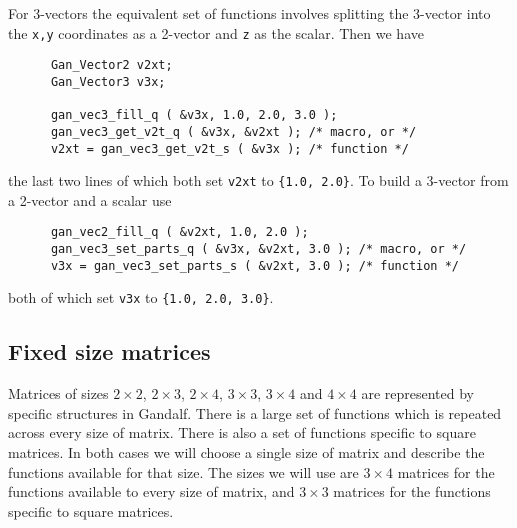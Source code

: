 For 3-vectors the equivalent set of functions involves splitting the
3-vector into the {\tt x,y} coordinates as a 2-vector and {\tt z} as the
scalar. Then we have
\begin{verbatim}
      Gan_Vector2 v2xt;
      Gan_Vector3 v3x;

      gan_vec3_fill_q ( &v3x, 1.0, 2.0, 3.0 );
      gan_vec3_get_v2t_q ( &v3x, &v2xt ); /* macro, or */
      v2xt = gan_vec3_get_v2t_s ( &v3x ); /* function */
\end{verbatim}
the last two lines of which both set {\tt v2xt} to {\tt \{1.0, 2.0\}}.
To build a 3-vector from a 2-vector and a scalar use
\begin{verbatim}
      gan_vec2_fill_q ( &v2xt, 1.0, 2.0 );
      gan_vec3_set_parts_q ( &v3x, &v2xt, 3.0 ); /* macro, or */
      v3x = gan_vec3_set_parts_s ( &v2xt, 3.0 ); /* function */
\end{verbatim}
both of which set {\tt v3x} to {\tt \{1.0, 2.0, 3.0\}}.

\subsection{Fixed size matrices} \label{fixed-size-mat-sec}
Matrices of sizes $2\times 2$, $2\times 3$, $2\times 4$, $3\times 3$,
$3\times 4$ and $4\times 4$ are represented by specific structures
in Gandalf. There is a large set of functions which is repeated across
every size of matrix. There is also a set of functions specific to square
matrices. In both cases we will choose a single size of matrix and describe
the functions available for that size. The sizes we will use are $3\times 4$
matrices for the functions available to every size of matrix, and $3\times 3$
matrices for the functions specific to square matrices.

